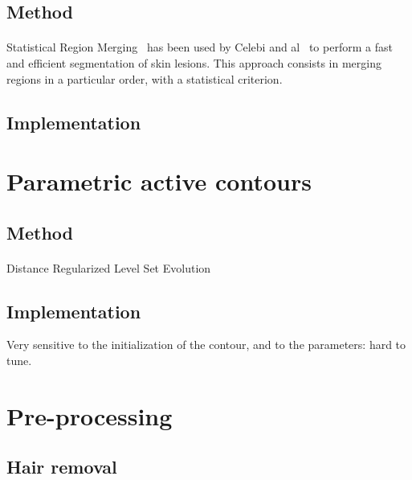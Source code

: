 \documentclass[a4paper,10pt]{article}
\begin{document}
\subsection{Method}
\paragraph{} Statistical Region Merging~\cite{nock_statistical_2004} has been 
used by Celebi and al~\cite{celebi_border_2008} to perform a fast and efficient 
segmentation of skin lesions. This approach consists in merging regions in a particular order, with a statistical criterion.
\subsection{Implementation}

\section{Parametric active contours}
\subsection{Method}
\paragraph{}  Distance Regularized Level Set Evolution \cite{li2010distance} 
\subsection{Implementation}
Very sensitive to the initialization of the contour, and to the parameters: hard to tune.

\section{Pre-processing}
\subsection{Hair removal}
\end{document}
